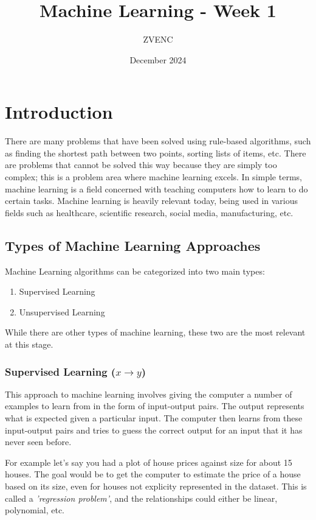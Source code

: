 \documentclass{article}
\title{Machine Learning - Week 1}
\author{ZVENC}
\date{December 2024}
\begin{document}
\maketitle


\section{Introduction}
There are many problems that have been solved using rule-based algorithms, such as finding the shortest path between two points, sorting lists of items, etc. There are problems that cannot be solved this way because they are simply too complex; this is a problem area where machine learning excels. In simple terms, machine learning is a field concerned with teaching computers how to learn to do certain tasks. Machine learning is heavily relevant today, being used in various fields such as healthcare, scientific research, social media, manufacturing, etc.

\subsection{Types of Machine Learning Approaches}
Machine Learning algorithms can be categorized into two main types:

\begin{enumerate}

\item Supervised Learning
\item Unsupervised Learning

\end{enumerate}

\noindent While there are other types of machine learning, these two are the most relevant at this stage.

\subsubsection{Supervised Learning ($x \rightarrow y$)}
This approach to machine learning involves giving the computer a number of examples to learn from in the form of input-output pairs. The output represents what is expected given a particular input. The computer then learns from these input-output pairs and tries to guess the correct output for an input that it has never seen before.

For example let's say you had a plot of house prices against size for about 15 houses. The goal would be to get the computer to estimate the price of a house based on its size, even for houses not explicity represented in the dataset. This is called a \textit{'regression problem'}, and the relationships could either be linear, polynomial, etc.
\end{document}
